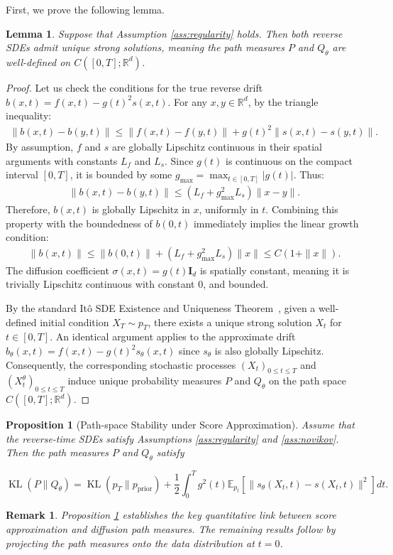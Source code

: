 \documentclass[11pt]{article}
\newtheorem{proposition}{Proposition}
\newtheorem{lemma}{Lemma}
\newtheorem{remark}{Remark}
\DeclareMathOperator{\KL}{KL}
\begin{document}
First, we prove the following lemma. 
\begin{lemma} \label{aux:lem}
Suppose that Assumption \ref{ass:regularity} holds. Then both reverse SDEs admit unique strong solutions, meaning the path measures $P$ and $Q_\theta$ are well-defined on $C([0, T]; \mathbb{R}^d)$.
\end{lemma}

\begin{proof}
Let us check the conditions for the true reverse drift $b(x, t) = f(x, t) - g(t)^2 s(x, t)$. For any $x, y \in \mathbb{R}^d$, by the triangle inequality:
\begin{align}
\|b(x, t) - b(y, t)\| \le \|f(x, t) - f(y, t)\| + g(t)^2 \|s(x, t) - s(y, t)\|.
\end{align}
By assumption, $f$ and $s$ are globally Lipschitz continuous in their spatial arguments with constants $L_f$ and $L_s$. Since $g(t)$ is continuous on the compact interval $[0, T]$, it is bounded by some $g_{\max} = \max_{t \in [0,T]} |g(t)|$. Thus:
\begin{align}
\|b(x, t) - b(y, t)\| \le \left(L_f + g_{\max}^2 L_s\right) \|x - y\|.
\end{align}
Therefore, $b(x, t)$ is globally Lipschitz in $x$, uniformly in $t$. Combining this property with the boundedness of $b(0, t)$ immediately implies the linear growth condition:
\begin{align}
\|b(x, t)\| \le \|b(0, t)\| + \left(L_f + g_{\max}^2 L_s\right) \|x\| \le C(1 + \|x\|).
\end{align}
The diffusion coefficient $\sigma(x,t) = g(t)\mathbf{I}_d$ is spatially constant, meaning it is trivially Lipschitz continuous with constant 0, and bounded. 

By the standard It\^o SDE Existence and Uniqueness Theorem~\cite[Theorem~5.2.1]{Oksendal2003}, given a well-defined initial condition $X_T \sim p_T$, there exists a unique strong solution $X_t$ for $t \in [0, T]$.
 An identical argument applies to the approximate drift $b_\theta(x, t) = f(x, t) - g(t)^2 s_\theta(x, t)$ since $s_\theta$ is also globally Lipschitz. Consequently, the corresponding stochastic processes $(X_t)_{0\le t\le T}$ and $(X_t^\theta)_{0\le t\le T}$ induce unique probability measures $P$ and $Q_\theta$ on the path space $C([0,T];\mathbb R^d)$.
\end{proof}

\begin{proposition}[Path-space Stability under Score Approximation]\label{prop1}
Assume that the reverse-time SDEs satisfy Assumptions \ref{ass:regularity} and \ref{ass:novikov}.
Then the path measures $P$ and $Q_\theta$ satisfy

\[
\boxed{
\KL(P\|Q_\theta)
=
\KL(p_T\|p_{\mathrm{prior}})
+
\frac12
\int_0^T
g^2(t)
\mathbb E_{p_t}
\!\left[
\|s_\theta(X_t,t)-s(X_t,t)\|^2
\right]dt.
}
\]
\end{proposition}
\begin{remark}
Proposition \ref{prop1} establishes the key quantitative link between score approximation and diffusion path measures. The remaining results follow by projecting the path measures onto the data distribution at $t=0$.
\end{remark}
\end{document}
